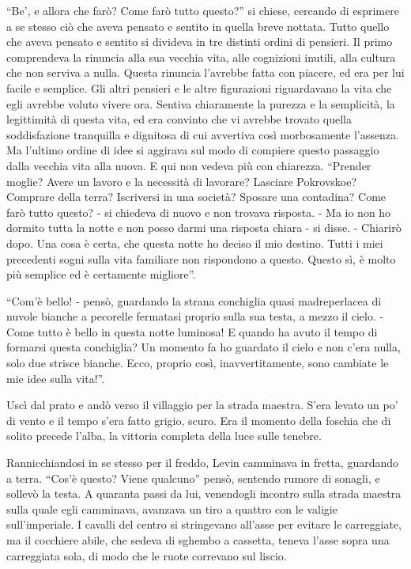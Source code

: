 ``Be', e allora che farò? Come farò tutto questo?'' si chiese, cercando di esprimere a se stesso ciò che aveva pensato e sentito in quella breve nottata. Tutto quello che aveva pensato e sentito si divideva in tre distinti ordini di pensieri. Il primo comprendeva la rinuncia alla sua vecchia vita, alle cognizioni inutili, alla cultura che non serviva a nulla. Questa rinuncia l'avrebbe fatta con piacere, ed era per lui facile e semplice. Gli altri pensieri e le altre figurazioni riguardavano la vita che egli avrebbe voluto vivere ora. Sentiva chiaramente la purezza e la semplicità, la legittimità di questa vita, ed era convinto che vi avrebbe trovato quella soddisfazione tranquilla e dignitosa di cui avvertiva così morbosamente l'assenza. Ma l'ultimo ordine di idee si aggirava sul modo di compiere questo passaggio dalla vecchia vita alla nuova. E qui non vedeva più con chiarezza. ``Prender moglie? Avere un lavoro e la necessità di lavorare? Lasciare Pokrovskoe? Comprare della terra? Iscriversi in una società? Sposare una contadina? Come farò tutto questo? - si chiedeva di nuovo e non trovava risposta. - Ma io non ho dormito tutta la notte e non posso darmi una risposta chiara - si disse. - Chiarirò dopo. Una cosa è certa, che questa notte ho deciso il mio destino. Tutti i miei precedenti sogni sulla vita familiare non rispondono a questo. Questo sì, è molto più semplice ed è certamente migliore''. 

``Com'è bello! - pensò, guardando la strana conchiglia quasi madreperlacea di nuvole bianche a pecorelle fermatasi proprio sulla sua testa, a mezzo il cielo. - Come tutto è bello in questa notte luminosa! E quando ha avuto il tempo di formarsi questa conchiglia? Un momento fa ho guardato il cielo e non c'era nulla, solo due strisce bianche. Ecco, proprio così, inavvertitamente, sono cambiate le mie idee sulla vita!''. 

Uscì dal prato e andò verso il villaggio per la strada maestra. S'era levato un po' di vento e il tempo s'era fatto grigio, scuro. Era il momento della foschia che di solito precede l'alba, la vittoria completa della luce sulle tenebre. 

Rannicchiandosi in se stesso per il freddo, Levin camminava in fretta, guardando a terra. ``Cos'è questo? Viene qualcuno'' pensò, sentendo rumore di sonagli, e sollevò la testa. A quaranta passi da lui, venendogli incontro sulla strada maestra sulla quale egli camminava, avanzava un tiro a quattro con le valigie sull'imperiale. I cavalli del centro si stringevano all'asse per evitare le carreggiate, ma il cocchiere abile, che sedeva di sghembo a cassetta, teneva l'asse sopra una carreggiata sola, di modo che le ruote correvano sul liscio. 

